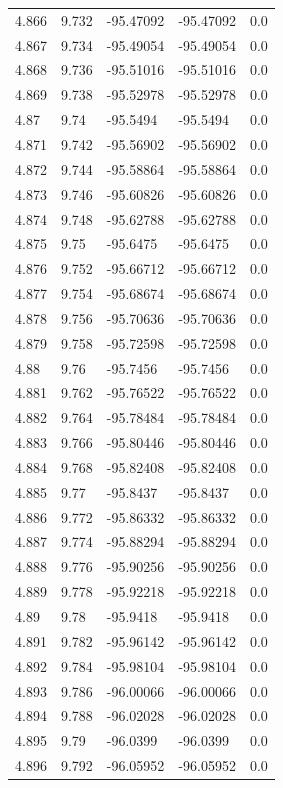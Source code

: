 \begin{tabular}{lllll}
4.866 & 9.732 & -95.47092 & -95.47092 & 0.0 \\
4.867 & 9.734 & -95.49054 & -95.49054 & 0.0 \\
4.868 & 9.736 & -95.51016 & -95.51016 & 0.0 \\
4.869 & 9.738 & -95.52978 & -95.52978 & 0.0 \\
4.87 & 9.74 & -95.5494 & -95.5494 & 0.0 \\
4.871 & 9.742 & -95.56902 & -95.56902 & 0.0 \\
4.872 & 9.744 & -95.58864 & -95.58864 & 0.0 \\
4.873 & 9.746 & -95.60826 & -95.60826 & 0.0 \\
4.874 & 9.748 & -95.62788 & -95.62788 & 0.0 \\
4.875 & 9.75 & -95.6475 & -95.6475 & 0.0 \\
4.876 & 9.752 & -95.66712 & -95.66712 & 0.0 \\
4.877 & 9.754 & -95.68674 & -95.68674 & 0.0 \\
4.878 & 9.756 & -95.70636 & -95.70636 & 0.0 \\
4.879 & 9.758 & -95.72598 & -95.72598 & 0.0 \\
4.88 & 9.76 & -95.7456 & -95.7456 & 0.0 \\
4.881 & 9.762 & -95.76522 & -95.76522 & 0.0 \\
4.882 & 9.764 & -95.78484 & -95.78484 & 0.0 \\
4.883 & 9.766 & -95.80446 & -95.80446 & 0.0 \\
4.884 & 9.768 & -95.82408 & -95.82408 & 0.0 \\
4.885 & 9.77 & -95.8437 & -95.8437 & 0.0 \\
4.886 & 9.772 & -95.86332 & -95.86332 & 0.0 \\
4.887 & 9.774 & -95.88294 & -95.88294 & 0.0 \\
4.888 & 9.776 & -95.90256 & -95.90256 & 0.0 \\
4.889 & 9.778 & -95.92218 & -95.92218 & 0.0 \\
4.89 & 9.78 & -95.9418 & -95.9418 & 0.0 \\
4.891 & 9.782 & -95.96142 & -95.96142 & 0.0 \\
4.892 & 9.784 & -95.98104 & -95.98104 & 0.0 \\
4.893 & 9.786 & -96.00066 & -96.00066 & 0.0 \\
4.894 & 9.788 & -96.02028 & -96.02028 & 0.0 \\
4.895 & 9.79 & -96.0399 & -96.0399 & 0.0 \\
4.896 & 9.792 & -96.05952 & -96.05952 & 0.0 \\

\end{tabular}
